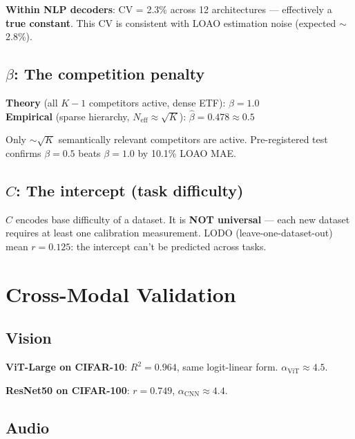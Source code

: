 \documentclass[11pt,a4paper]{article}
\begin{document}
\textbf{Within NLP decoders}: CV = 2.3\% across 12 architectures --- effectively a \textbf{true constant}. This CV is consistent with LOAO estimation noise (expected $\sim$2.8\%).

\subsection{$\beta$: The competition penalty}

\begin{keybox}
\textbf{Theory} (all $K{-}1$ competitors active, dense ETF): $\beta = 1.0$\\
\textbf{Empirical} (sparse hierarchy, $N_\mathrm{eff} \approx \sqrt{K}$): $\hat\beta = 0.478 \approx 0.5$

Only $\sim$$\sqrt{K}$ semantically relevant competitors are active. Pre-registered test confirms $\beta{=}0.5$ beats $\beta{=}1.0$ by 10.1\% LOAO MAE.
\end{keybox}

\subsection{$C$: The intercept (task difficulty)}

$C$ encodes base difficulty of a dataset. It is \textbf{NOT universal} --- each new dataset requires at least one calibration measurement. LODO (leave-one-dataset-out) mean $r = 0.125$: the intercept can't be predicted across tasks.

\section{Cross-Modal Validation}

\subsection{Vision}

\textbf{ViT-Large on CIFAR-10}: $R^2 = 0.964$, same logit-linear form. $\alpha_\mathrm{ViT} \approx 4.5$.

\textbf{ResNet50 on CIFAR-100}: $r = 0.749$, $\alpha_\mathrm{CNN} \approx 4.4$.

\subsection{Audio}
\end{document}

